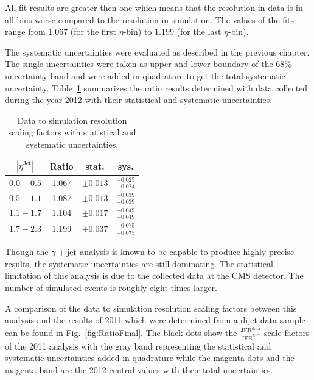 All fit results are greater then one which means that the resolution in data is in all bins worse compared to the resolution in simulation.
The values of the fits range from 1.067 (for the first $\eta$-bin) to 1.199 (for the last $\eta$-bin). 

The systematic uncertainties were evaluated as described in the previous chapter. 
The single uncertainties were taken as upper and lower boundary of the 68\% uncertainty band and were added in quadrature to get the total systematic uncertainty.
\mbox{Table \ref{tab:FinalResults}} summarizes the ratio results determined with data collected during the year 2012 with their statistical and systematic uncertainties.

\begin{table}[t]
\caption{Data to simulation resolution scaling factors with statistical and systematic uncertainties.}\renewcommand{\arraystretch}{2.0}
\large{
\begin{center}
\begin{tabular}{ | c | c   c c| }
$|\eta^{\text{Jet}}|$ & Ratio &  stat.      & sys.  \\\hline
$0.0 - 0.5$ &1.067 & $\pm 0.013$ & $^{+0.025}_{-0.024}$ \\
$0.5 - 1.1$ &1.087 & $\pm 0.013$ & $^{+0.039}_{-0.039}$ \\
$1.1 - 1.7$ &1.104 & $\pm 0.017$ & $^{+0.049}_{-0.049}$ \\
$1.7 - 2.3$ &1.199 & $\pm 0.037$ & $^{+0.075}_{-0.075}$ \\
\hline
\end{tabular}
\end{center}
}
\label{tab:FinalResults}
\end{table}

Though the $\gamma + \text{jet}$ analysis is known to be capable to produce highly precise results, the systematic uncertainties are still dominating. 
The statistical limitation of this analysis is due to the collected data at the CMS detector. 
The number of simulated events is roughly eight times larger.
 
A comparison of the data to simulation resolution scaling factors between this analysis and the results of 2011 which were determined from a dijet data sample
\cite{Schroder:2012} can be found in \mbox{Fig. \ref{fig:RatioFinal}}.
The black dots show the $\frac{\text{JER}^{\text{data}}}{\text{JER}^{\text{MC}}}$ scale factors of the 2011 analysis with the gray band 
representing the statistical and systematic uncertainties added in quadrature while the magenta dots and the magenta band
are the 2012 central values with their total uncertainties.


